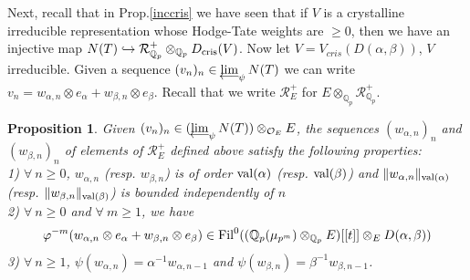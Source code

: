 \documentclass[11pt]{amsart}
\def\limproj{\mathop{\oalign{{\rm lim}\cr 
\hidewidth$\longleftarrow$\hidewidth\cr}}}
\def\Q{{\mathbb Q}_p}
\def\O{{\mathcal O}_E}
\def\dcris{D_{\rm cris}}
\newtheorem{prop}[definit]{\bf{Proposition}}
\begin{document}
Next, recall that in Prop.\ref{inccris} 
we have seen that if $V$ is a 
crystalline irreducible representation whose Hodge-Tate weights are 
$\geq 0$, then we have an injective map $N(T) \hookrightarrow 
{\mathcal R}_{\Q}^+ \otimes_{\Q} \dcris(V)$. Now let 
$V=V_{cris}(D(\alpha,\beta))$, $V$ irreducible. Given a sequence $(v_n)_n \in 
\limproj_{\psi}N(T)$ we can write $v_n = w_{\alpha,n} \otimes e_\alpha 
+ w_{\beta,n} \otimes e_\beta$. Recall that we write ${\mathcal 
R}_E^+$ for $E \otimes_{\Q} {\mathcal R}_{\Q}^+$. 
 
\begin{prop}\label{conditions} 
Given $(v_n)_n \in (\limproj_{\psi}N(T)) \otimes_{\O} E$,  
the sequences $(w_{\alpha,n})_n$ and $(w_{\beta,n})_n$  
of elements of ${\mathcal R}_E^+$ defined above satisfy the following
properties:\\  
1) $\forall\ n\geq 0$, $w_{\alpha,n}$ (resp. $w_{\beta,n}$) is of  
order ${\rm val}(\alpha)$ (resp. ${\rm val}(\beta)$) and  
$\|w_{\alpha,n}\|_{{\rm val}(\alpha)}$ (resp. $\|w_{\beta,n}\|_{{\rm val}(\beta)}$)  
is bounded independently of $n$\\ 
2) $\forall\ n\geq 0$ and $\forall\ m\geq 1$, we have 
$$\varphi^{-m}(w_{\alpha,n}\otimes e_{\alpha}+w_{\beta,n}\otimes 
e_{\beta})\in {\rm Fil}^0((\Q(\mu_{p^m})\otimes_{\Q}E)[[t]]\otimes_ED(\alpha,\beta))$$ 
3) $\forall\ n\geq 1$, $\psi(w_{\alpha,n})=\alpha^{-1}w_{\alpha,n-1}$ and  
$\psi(w_{\beta,n})=\beta^{-1}w_{\beta,n-1}$. 
\end{prop} 
\end{document}
